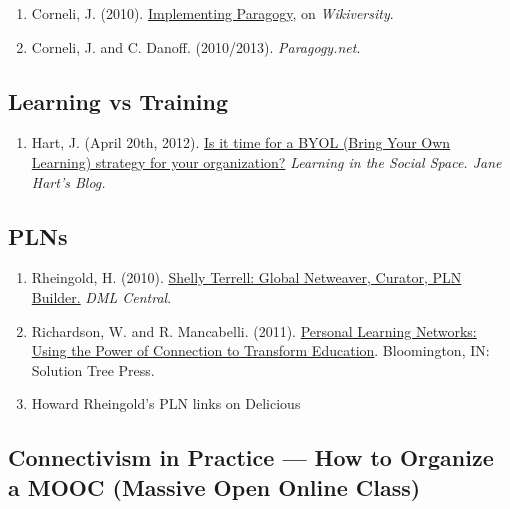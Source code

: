 \begin{enumerate}
\def\labelenumi{\arabic{enumi}.}
\item
  Corneli, J. (2010).
  \href{http://metameso.org/~joe/docs/paragogy-lesson.pdf}{Implementing
  Paragogy}, on \emph{Wikiversity}.
\item
  Corneli, J. and C. Danoff. (2010/2013). \emph{Paragogy.net}.
\end{enumerate}

\hypertarget{learning-vs-training}{%
\subsection{Learning vs Training}\label{learning-vs-training}}

\begin{enumerate}
\def\labelenumi{\arabic{enumi}.}
\tightlist
\item
  Hart, J. (April 20th, 2012).
  \href{http://www.c4lpt.co.uk/blog/2012/04/20/is-it-time-for-a-byol-bring-your-own-learning-strategy-in-your-organization-byol/}{Is
  it time for a BYOL (Bring Your Own Learning) strategy for your
  organization?} \emph{Learning in the Social Space. Jane Hart's Blog.}
\end{enumerate}

\hypertarget{plns}{%
\subsection{PLNs}\label{plns}}

\begin{enumerate}
\def\labelenumi{\arabic{enumi}.}
\item
  Rheingold, H. (2010).
  \href{http://dmlcentral.net/blog/howard-rheingold/shelly-terrell-global-netweaver-curator-pln-builder}{Shelly
  Terrell: Global Netweaver, Curator, PLN Builder.} \emph{DML Central}.
\item
  Richardson, W. and R. Mancabelli. (2011).
  \href{http://www.amazon.com/Personal-Learning-Networks-Connections-Transform/dp/193554327X}{Personal
  Learning Networks: Using the Power of Connection to Transform
  Education}. Bloomington, IN: Solution Tree Press.
\item
  Howard Rheingold's PLN links on Delicious
\end{enumerate}

\hypertarget{connectivism-in-practice-how-to-organize-a-mooc-massive-open-online-class}{%
\subsection{Connectivism in Practice --- How to Organize a MOOC (Massive
Open Online
Class)}\label{connectivism-in-practice-how-to-organize-a-mooc-massive-open-online-class}}

